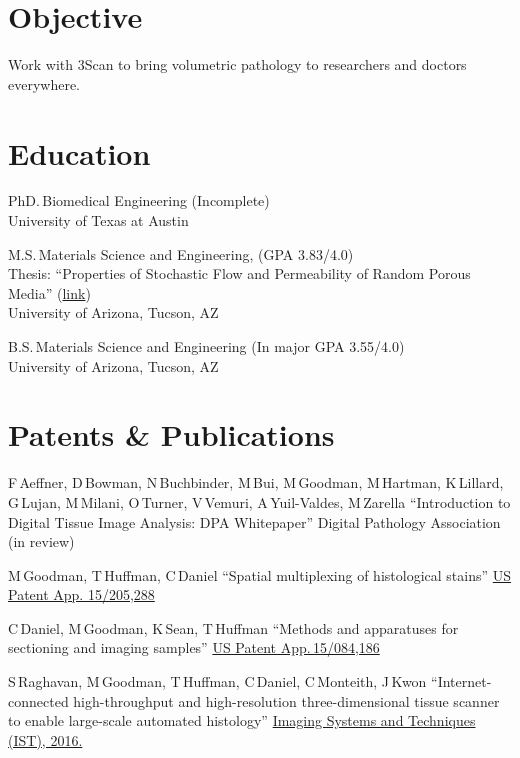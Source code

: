 \documentclass{res}
\begin{document}
\begin{resume}

\section{Objective}
Work with 3Scan to bring volumetric pathology to researchers and doctors everywhere.

\section{Education}
PhD.\,Biomedical Engineering (Incomplete) \\
University of Texas at Austin

M.S.\,Materials Science and Engineering,
(GPA 3.83/4.0) \\
Thesis: ``Properties of Stochastic Flow and Permeability of Random Porous Media''
  (\href{http://hdl.handle.net/10150/193422}{link})  \\
University of Arizona, Tucson, AZ

B.S.\,Materials Science and Engineering (In major GPA 3.55/4.0) \\
University of Arizona, Tucson, AZ

\section{Patents \& Publications}

  F\,Aeffner, D\,Bowman, N\,Buchbinder, M\,Bui, M\,Goodman, M\,Hartman, K\,Lillard,
  G\,Lujan, M\,Milani, O\,Turner, V\,Vemuri, A\,Yuil-Valdes, M\,Zarella
  ``Introduction to Digital Tissue Image Analysis: DPA Whitepaper''
  Digital Pathology Association (in review)

  M\,Goodman, T\,Huffman, C\,Daniel
  ``Spatial multiplexing of histological stains''
  \href{https://patents.google.com/patent/US20170011511A1/en}{US Patent App. 15/205,288}

  C\,Daniel, M\,Goodman, K\,Sean, T\,Huffman
  ``Methods and apparatuses for sectioning and imaging samples''
  \href{https://patents.google.com/patent/US20160290895A1/en}{US Patent App.\,15/084,186}

  S\,Raghavan, M\,Goodman, T\,Huffman, C\,Daniel, C\,Monteith, J\,Kwon
  ``Internet-connected high-throughput and high-resolution three-dimensional tissue scanner to
  enable large-scale automated histology''
  \href{https://doi.org/10.1109/IST.2016.7738254}{Imaging Systems and Techniques (IST), 2016.}


\end{resume}
\end{document}
